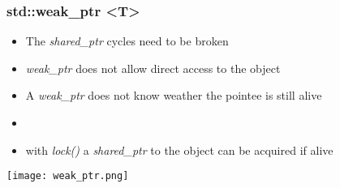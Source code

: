 \subsubsection{std::weak\_ptr \textless T\textgreater}
\begin{itemize}
    \item The \textit{shared\_ptr} cycles need to be broken
    \item \textit{weak\_ptr} does not allow direct access to the object
    \item A \textit{weak\_ptr} does not know weather the pointee is still alive
    \item \item with \textit{lock()} a \textit{shared\_ptr} to the object can be acquired if alive
\end{itemize}
\begin{center}
    \texttt{[image: weak\_ptr.png]}
\end{center}






























